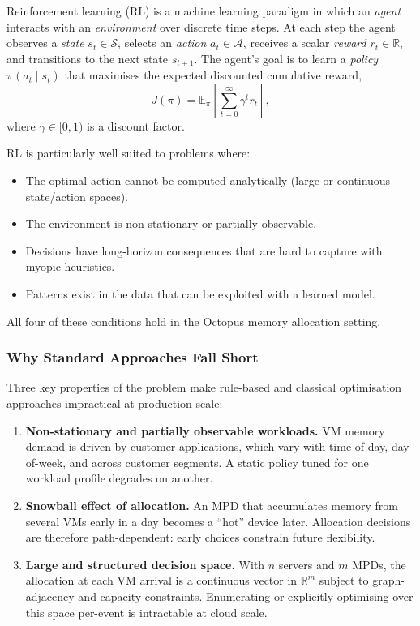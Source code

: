 \documentclass[11pt]{article}
\begin{document}
Reinforcement learning (RL) is a machine learning paradigm in which an
\emph{agent} interacts with an \emph{environment} over discrete time steps.
At each step the agent observes a \emph{state} $s_t \in \mathcal{S}$, selects
an \emph{action} $a_t \in \mathcal{A}$, receives a scalar \emph{reward}
$r_t \in \mathbb{R}$, and transitions to the next state $s_{t+1}$.  The agent's
goal is to learn a \emph{policy} $\pi(a_t \mid s_t)$ that maximises the
expected discounted cumulative reward,
\[
    J(\pi) = \mathbb{E}_{\pi}\!\left[\sum_{t=0}^{\infty} \gamma^t r_t\right],
\]
where $\gamma \in [0, 1)$ is a discount factor.

RL is particularly well suited to problems where:
\begin{itemize}
    \item The optimal action cannot be computed analytically (large or
          continuous state/action spaces).
    \item The environment is non-stationary or partially observable.
    \item Decisions have long-horizon consequences that are hard to capture
          with myopic heuristics.
    \item Patterns exist in the data that can be exploited with a
          learned model.
\end{itemize}

All four of these conditions hold in the Octopus memory allocation setting.

\subsubsection*{Why Standard Approaches Fall Short}

Three key properties of the problem make rule-based and classical
optimisation approaches impractical at production scale:

\begin{enumerate}
    \item \textbf{Non-stationary and partially observable workloads.}
    VM memory demand is driven by customer applications, which vary with
    time-of-day, day-of-week, and across customer segments.  A static policy
    tuned for one workload profile degrades on another.

    \item \textbf{Snowball effect of allocation.}
    An MPD that accumulates memory from several VMs early in a day becomes a
    ``hot'' device later.  Allocation decisions are therefore path-dependent:
    early choices constrain future flexibility.

    \item \textbf{Large and structured decision space.}
    With $n$ servers and $m$ MPDs, the allocation at each VM arrival is a
    continuous vector in $\mathbb{R}^m$ subject to graph-adjacency and
    capacity constraints.  Enumerating or explicitly optimising over this
    space per-event is intractable at cloud scale.
\end{enumerate}
\end{document}
